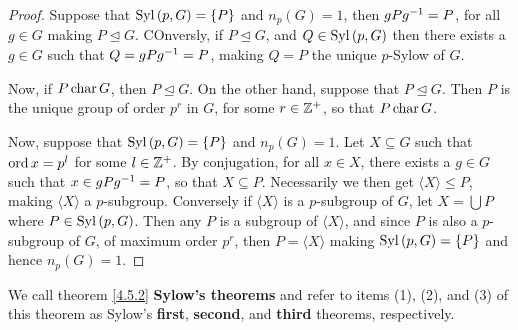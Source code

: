 \begin{proof}
    Suppose that $\operatorname{Syl}{(p,G)}=\{P\}$ and $n_p(G)=1$, then $gPg^{-1}=P$, for
    all $g \in G$ making $P \unlhd G$. COnversly, if $P \unlhd G$, and  $Q \in
    \operatorname{Syl}{(p,G)}$ then there exists a $g \in G$ such that  $Q=gPg^{-1}=P$, making
    $Q=P$ the unique $p$-Sylow of $G$.

    Now, if  $P \operatorname{char} G$, then  $P \unlhd G$. On the other hand, suppose that
    $P \unlhd G$. Then  $P$ is the unique group of order $p^r$ in $G$, for some
     $r \in \mathbb{Z}^+$, so that  $P \operatorname{char} G$.

     Now, suppose that $\operatorname{Syl}{(p,G)}=\{P\}$ and $n_p(G)=1$. Let $X \subseteq G$
     such that $\operatorname{ord}{x}=p^l$ for some $l \in \mathbb{Z}^+$. By conjugation, for all  $x
     \in X$, there exists a  $g \in G$ such that  $x \in gPg^{-1}=P$, so that
     $X \subseteq P$. Necessarily we then get  $\langle X \rangle \leq P$,
     making $\langle X \rangle$ a $p$-subgroup. Conversely if  $\langle X
     \rangle$ is a $p$-subgroup of $G$, let $X=\bigcup{P}$ where $P \in
     \operatorname{Syl}{(p,G)}$. Then any $P$ is a subgroup of  $\langle X \rangle$, and since
     $P$ is also a $p$-subgroup of  $G$, of maximum order $p^r$, then
     $P=\langle X \rangle$ making $\operatorname{Syl}{(p,G)}=\{P\}$ and hence $n_p(G)=1$.
\end{proof}

\begin{remark}
    We call theorem \ref{4.5.2} \textbf{Sylow's theorems} and refer to items
    (1), (2), and (3) of this theorem as Sylow's \textbf{first},
    \textbf{second}, and \textbf{third} theorems, respectively.
\end{remark}

